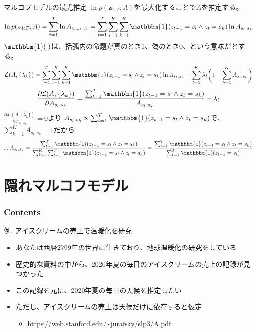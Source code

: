 \documentclass[aspectratio=169,unicode,dvipdfmx,14pt]{beamer}
\begin{document}
\begin{frame}{マルコフモデルの最尤推定}
\FontMath
$\ln p(\bm{z}_{1:T};A)$を最大化することで$A$を推定する。
\begin{align}
\ln p(\bm{z}_{1:T};A) 
= \sum_{t=1}^T \ln A_{z_{t-1}, z_t}
= \sum_{t=1}^T \sum_{l=1}^K \sum_{k=1}^K \mathbbm{1}(z_{t-1}=s_l \wedge z_t=s_k) \ln A_{s_l,s_k}
\end{align}
$\mathbbm{1}(\cdot)$は、括弧内の命題が真のとき$1$、偽のとき$0$、という意味だとする。
\vspace{-0.05in}
\begin{align}
\mathcal{L}(A,\{ \lambda_k \}) = 
\sum_{t=1}^T \sum_{l=1}^K \sum_{k=1}^K \mathbbm{1}(z_{t-1}=s_l \wedge z_t=s_k) \ln A_{s_l,s_k}
+ \sum_{l=1}^K \lambda_l \bigg( 1 - \sum_{k=1}^K A_{s_l,s_k} \bigg) 
\end{align}
\vspace{-0.1in}
\begin{align}
\frac{\partial \mathcal{L}(A,\{ \lambda_k \})}{\partial A_{s_l,s_k}}
= \frac{ \sum_{t=1}^T \mathbbm{1}(z_{t-1}=s_l \wedge z_t=s_k) }{ A_{s_l,s_k} } - \lambda_l
\end{align}
$\frac{\partial \mathcal{L}(A,\{ \lambda_k \})}{\partial A_{s_l,s_k}} = 0$より
$A_{s_l,s_k} \propto \sum_{t=1}^T \mathbbm{1}(z_{t-1}=s_l \wedge z_t=s_k)$で、
$\sum_{k=1}^K A_{s_l,s_k}=1$だから
\begin{align}
\therefore A_{s_l,s_k} = \frac{ \sum_{t=1}^T \mathbbm{1}(z_{t-1}=s_l \wedge z_t=s_k) }
{ \sum_{k=1}^K \sum_{t=1}^T \mathbbm{1}(z_{t-1}=s_l \wedge z_t=s_k) }
= \frac{ \sum_{t=1}^T \mathbbm{1}(z_{t-1}=s_l \wedge z_t=s_k) }
{ \sum_{t=1}^T \mathbbm{1}(z_{t-1}=s_l) }
\end{align}
\end{frame}

\section{隠れマルコフモデル}

\begin{frame}\frametitle{Contents}
\Large \tableofcontents[currentsection]
\end{frame}

\begin{frame}{例. アイスクリームの売上で温暖化を研究}
\begin{itemize}
\item あなたは西暦2799年の世界に生きており、地球温暖化の研究をしている
\item 歴史的な資料の中から、2020年夏の毎日のアイスクリームの売上の記録が見つかった
\item この記録を元に、2020年夏の毎日の天候を推定したい
\item ただし、アイスクリームの売上は天候だけに依存すると仮定
\begin{itemize}
\item \href{https://web.stanford.edu/~jurafsky/slp3/A.pdf}{https://web.stanford.edu/\~{}jurafsky/slp3/A.pdf}
\end{itemize}
\end{itemize}
\end{frame}
\end{document}
